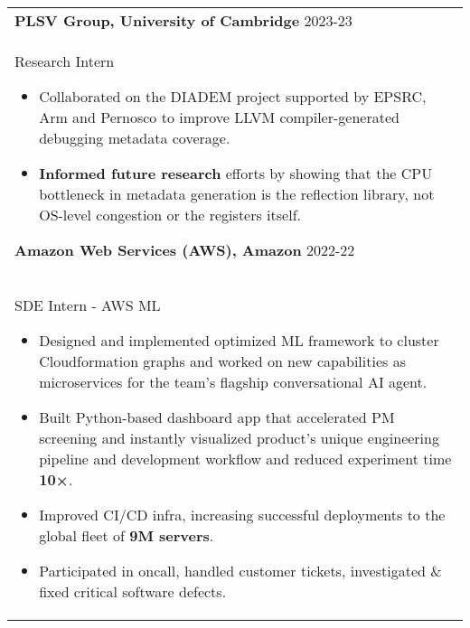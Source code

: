 \documentclass[12pt,a4paper]{article}
\begin{document}
\begin{longtable}{p{\textwidth}}
\textbf{PLSV Group, University of Cambridge} \hfill \small{2023-23} \\
       Research Intern \vspace{1pt}
       \begin{itemize}[itemsep=-2mm,topsep=0pt,partopsep=0pt,leftmargin=5mm]
        \item Collaborated on the DIADEM project supported by EPSRC, Arm and Pernosco to improve LLVM compiler-generated debugging metadata coverage.
        \item \textbf{Informed future research} efforts by showing that the CPU bottleneck in metadata generation is the reflection library, not OS-level congestion or the registers itself.

       \end{itemize} \vspace{2mm}
\textbf{Amazon Web Services (AWS), Amazon} \hfill \small{2022-22}  \\
       SDE Intern - AWS ML \vspace{1pt}
       \begin{itemize}[itemsep=-2mm,topsep=0pt,partopsep=0pt,leftmargin=5mm]
        \item Designed and implemented optimized ML framework to cluster  Cloudformation graphs and worked on new capabilities as microservices for the team’s flagship conversational AI agent.
        \item Built Python-based dashboard app that accelerated PM screening and instantly visualized product’s unique engineering pipeline and development workflow and reduced experiment time \textbf{10×}.
        \item Improved CI/CD infra, increasing successful deployments to the global fleet of \textbf{9M servers}.
        \item Participated in oncall, handled customer tickets, investigated \& fixed critical software defects.


\end{itemize}
\end{longtable}
\end{document}
